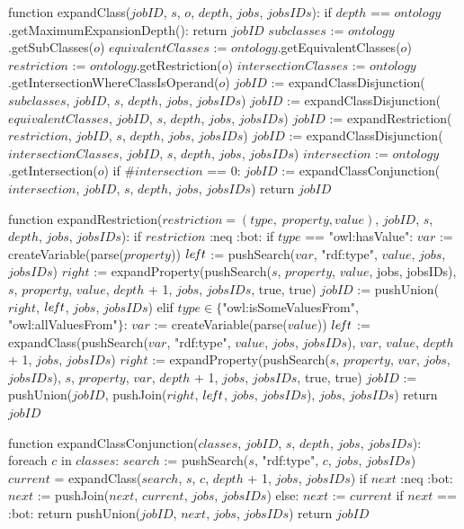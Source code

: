function expandClass($jobID$, $s$, $o$, $depth$, $jobs$, $jobsIDs$):
    if $depth$ == $ontology$.getMaximumExpansionDepth():
        return $jobID$
    $subclasses$ := $ontology$.getSubClasses($o$)
    $equivalentClasses$ := $ontology$.getEquivalentClasses($o$)
    $restriction$ := $ontology$.getRestriction($o$)
    $intersectionClasses$ := $ontology$.getIntersectionWhereClassIsOperand($o$)
    $jobID$ := expandClassDisjunction($subclasses$, $jobID$, $s$, $depth$, $jobs$, $jobsIDs$)
    $jobID$ := expandClassDisjunction($equivalentClasses$, $jobID$, $s$, $depth$, $jobs$, $jobsIDs$)
    $jobID$ := expandRestriction($restriction$, $jobID$, $s$, $depth$, $jobs$, $jobsIDs$)
    $jobID$ := expandClassDisjunction($intersectionClasses$, $jobID$, $s$, $depth$, $jobs$, $jobsIDs$)
    $intersection$ := $ontology$.getIntersection($o$)
    if $\#intersection$ == 0:
        $jobID$ := expandClassConjunction($intersection$, $jobID$, $s$, $depth$, $jobs$, $jobsIDs$)
    return $jobID$

function expandRestriction($restriction = (type, \; property, value)$, $jobID$, $s$, $depth$, $jobs$, $jobsIDs$):   
    if $restriction$ :neq :bot:
        if $type$ == "owl:hasValue":
        $var$ := createVariable(parse($property$))
            $le\textrm{\emph{f}}t$ := pushSearch($var$, "rdf:type", $value$, $jobs$, $jobsIDs$) 
            $right$ := expandProperty(pushSearch($s$, $property$, $value$, jobs, jobsIDs), $s$, $property$, $value$, $depth$ + 1, $jobs$, $jobsIDs$, true, true)
            $jobID$ := pushUnion($right$, $le\textrm{\emph{f}}t$, $jobs$, $jobsIDs$)
        elif $type \in \{$"owl:isSomeValuesFrom", "owl:allValuesFrom"$\}$:
            $var$ := createVariable(parse($value$))
            $le\textrm{\emph{f}}t$ := expandClass(pushSearch($var$, "rdf:type", $value$, $jobs$, $jobsIDs$), $var$, $value$, $depth$ + 1, $jobs$, $jobsIDs$)
            $right$ := expandProperty(pushSearch($s$, $property$, $var$, $jobs$, $jobsIDs$), $s$, $property$, $var$, $depth$ + 1, $jobs$, $jobsIDs$, true, true)
            $jobID$ := pushUnion($jobID$, pushJoin($right$, $le\textrm{\emph{f}}t$, $jobs$, $jobsIDs$), $jobs$, $jobsIDs$)
    return $jobID$

function expandClassConjunction($classes$, $jobID$, $s$, $depth$, $jobs$, $jobsIDs$):
    foreach $c$ in $classes$:
        $search$ := pushSearch($s$, "rdf:type", $c$, $jobs$, $jobsIDs$)
        $current$ = expandClass($search$, $s$, $c$, $depth$ + 1, $jobs$, $jobsIDs$)
        if $next$ :neq :bot:
            $next$ := pushJoin($next$, $current$, $jobs$, $jobsIDs$)
        else:
            $next$ := $current$
    if $next$ == :bot:
        return pushUnion($jobID$, $next$, $jobs$, $jobsIDs$)
    return $jobID$


